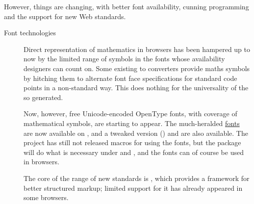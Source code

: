 However, things are changing, with
better font availability, cunning  programming and the
support for new Web standards.
\begin{description}
\item[Font technologies] Direct representation of mathematics in
  browsers has been hampered up to now by the limited range of symbols
  in the fonts whose availability designers can count on.  Some existing
  \AllTeX{} to  converters provide maths symbols by
  hitching them to alternate font face specifications for standard
  code points in a non-standard way.  This does nothing for the
  universality of the  so generated.

  Now, however, free Unicode-encoded OpenType fonts, with coverage of
  mathematical symbols, are starting to appear.  The much-heralded
  \href{http://www.stixfonts.org/}{ fonts} are now
  available on , and a tweaked version
  () and  are also
  available.  The  project has still not released macros
  for using the fonts, but the  package will do
  what is necessary under \xetex{} and \luatex{}, and the fonts can of
  course be used in browsers.
\item[] The core of the range of new standards is
  , which provides a framework for better structured markup;
  limited support for it has already appeared in some browsers.


\end{description}
